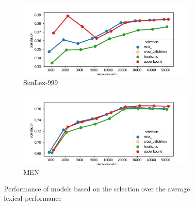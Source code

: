 \begin{figure}[b]
  \centering

  \begin{subfigure}[t]{0.49\textwidth}
    \includegraphics[width=\textwidth]{supplement/figures/lexical-results-SimLex999}
    \caption{SimLex-999}
    \label{fig:lexical-results-simlex}
  \end{subfigure}
  \begin{subfigure}[t]{0.49\textwidth}
    \includegraphics[width=\textwidth]{supplement/figures/lexical-results-men}
    \caption{MEN}
    \label{fig:lexical-results-men}
  \end{subfigure}

  \caption{Performance of models based on the selection over the average lexical performance}
  \label{fig:lexical-results}
\end{figure}

